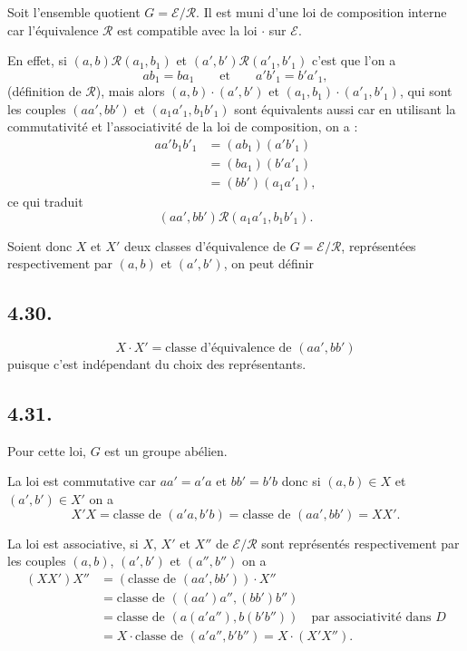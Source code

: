 Soit l'ensemble quotient $G=\mathcal E/\mathcal R$. Il est muni d'une loi de composition interne car l'équivalence $\mathcal R$ est compatible avec la loi $\cdot$ sur $\mathcal E$.

En effet, si $(a,b)\mathcal R(a_1,b_1)$ et $(a',b')\mathcal R(a'_1,b'_1)$ c'est que l'on a
\[
ab_1=ba_1\qquad\text{et}\qquad a'b'_1=b'a'_1,
\]
(définition de $\mathcal R$), mais alors $(a,b)\cdot(a',b')$ et $(a_1,b_1)\cdot(a'_1,b'_1)$, qui sont les couples $(aa',bb')$ et $(a_1a'_1,b_1b'_1)$ sont équivalents aussi car en utilisant la commutativité et l'associativité de la loi de composition, on a :
\begin{align*}
aa'b_1b'_1
&=(ab_1)(a'b'_1)\\
&=(ba_1)(b'a'_1)\\
&=(bb')(a_1a'_1),
\end{align*}
ce qui traduit
\[
(aa',bb')\mathcal R(a_1a'_1,b_1b'_1).
\]

Soient donc $X$ et $X'$ deux classes d'équivalence de $G=\mathcal E/\mathcal R$, représentées respectivement par $(a,b)$ et $(a',b')$, on peut définir

\subsection*{4.30.}
\[
X\cdot X'=\text{classe d'équivalence de }(aa',bb')
\]
puisque c'est indépendant du choix des représentants.

\subsection*{4.31.}
Pour cette loi, $G$ est un groupe abélien.

La loi est commutative car $aa'=a'a$ et $bb'=b'b$ donc si $(a,b)\in X$ et $(a',b')\in X'$ on a
\[
X'X=\text{classe de }(a'a,b'b)
=\text{classe de }(aa',bb')=XX'.
\]

La loi est associative, si $X$, $X'$ et $X''$ de $\mathcal E/\mathcal R$ sont représentés respectivement par les couples $(a,b)$, $(a',b')$ et $(a'',b'')$ on a
\begin{align*}
(XX')X''
&=(\text{classe de }(aa',bb'))\cdot X''\\
&=\text{classe de }((aa')a'',(bb')b'')\\
&=\text{classe de }(a(a'a''),b(b'b''))\quad\text{par associativité dans $D$}\\
&=X\cdot\text{classe de }(a'a'',b'b'')=X\cdot(X'X'').
\end{align*}

